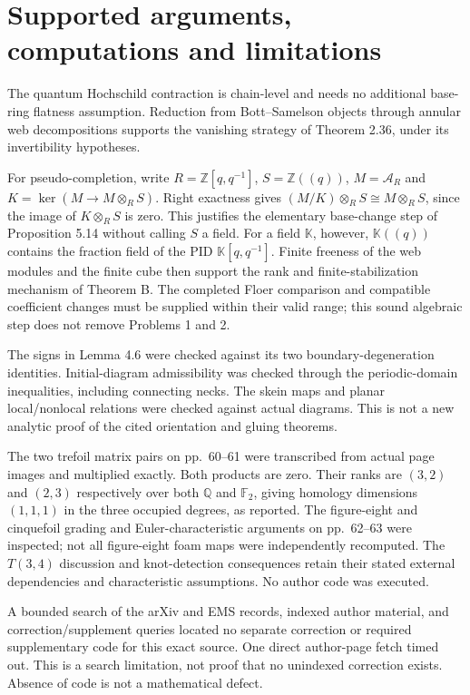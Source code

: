 \documentclass[10pt]{article}
\begin{document}
\section*{Supported arguments, computations and limitations}
The quantum Hochschild contraction is chain-level and needs no additional base-ring flatness assumption. Reduction from Bott–Samelson objects through annular web decompositions supports the vanishing strategy of Theorem 2.36, under its invertibility hypotheses.\par
For pseudo-completion, write \(R=\mathbb Z[q,q^{-1}]\), \(S=\mathbb Z((q))\), \(M=\mathcal A_R\) and \(K=\ker(M\to M\otimes_RS)\). Right exactness gives \((M/K)\otimes_RS\cong M\otimes_RS\), since the image of \(K\otimes_RS\) is zero. This justifies the elementary base-change step of Proposition 5.14 without calling \(S\) a field. For a field \(\mathbb K\), however, \(\mathbb K((q))\) contains the fraction field of the PID \(\mathbb K[q,q^{-1}]\). Finite freeness of the web modules and the finite cube then support the rank and finite-stabilization mechanism of Theorem B. The completed Floer comparison and compatible coefficient changes must be supplied within their valid range; this sound algebraic step does not remove Problems 1 and 2.\par
The signs in Lemma 4.6 were checked against its two boundary-degeneration identities. Initial-diagram admissibility was checked through the periodic-domain inequalities, including connecting necks. The skein maps and planar local/nonlocal relations were checked against actual diagrams. This is not a new analytic proof of the cited orientation and gluing theorems.\par
The two trefoil matrix pairs on pp. 60–61 were transcribed from actual page images and multiplied exactly. Both products are zero. Their ranks are \((3,2)\) and \((2,3)\) respectively over both \(\mathbb Q\) and \(\mathbb F_2\), giving homology dimensions \((1,1,1)\) in the three occupied degrees, as reported. The figure-eight and cinquefoil grading and Euler-characteristic arguments on pp. 62–63 were inspected; not all figure-eight foam maps were independently recomputed. The \(T(3,4)\) discussion and knot-detection consequences retain their stated external dependencies and characteristic assumptions. No author code was executed.\par
A bounded search of the arXiv and EMS records, indexed author material, and correction/supplement queries located no separate correction or required supplementary code for this exact source. One direct author-page fetch timed out. This is a search limitation, not proof that no unindexed correction exists. Absence of code is not a mathematical defect.\par
\end{document}
